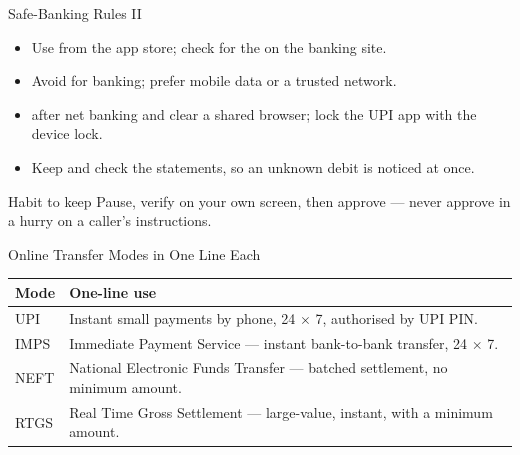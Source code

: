 \documentclass[aspectratio=169]{beamer}
\begin{document}
\begin{frame}{Safe-Banking Rules II}
  \begin{itemize}
    \item Use  from the app store;
      check for the  on the banking site.
    \item Avoid  for banking; prefer mobile data or a
      trusted network.
    \item {} after net banking and clear a shared browser; lock
      the UPI app with the device lock.
    \item Keep  and check the statements, so an
      unknown debit is noticed at once.
  \end{itemize}
  \begin{block}{Habit to keep}
    Pause, verify on your own screen, then approve --- never approve in a
    hurry on a caller's instructions.
  \end{block}
\end{frame}

\begin{frame}{Online Transfer Modes in One Line Each}
  \begin{center}
    \begin{tabular}{p{}p{}}
      \toprule
      \textbf{Mode} & \textbf{One-line use} \\
      \midrule
      UPI & Instant small payments by phone, 24 $\times$ 7, authorised by UPI PIN. \\
      IMPS & Immediate Payment Service --- instant bank-to-bank transfer, 24 $\times$ 7. \\
      NEFT & National Electronic Funds Transfer --- batched settlement, no minimum amount. \\
      RTGS & Real Time Gross Settlement --- large-value, instant, with a minimum amount. \\
      \bottomrule
    \end{tabular}
  \end{center}
  \vspace{0.25cm}
\end{frame}
\end{document}
